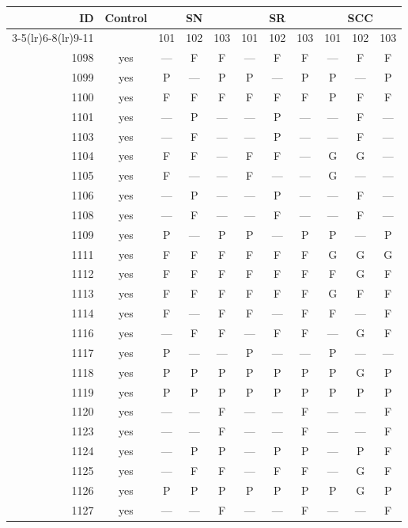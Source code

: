 \begin{table}[p]\centering\small
\begin{tabular*}{\textwidth}{@{\extracolsep{\fill}}rc*{9}{c}@{}}\toprule
ID & Control & \multicolumn{3}{c}{SN} & \multicolumn{3}{c}{SR} & \multicolumn{3}{c}{SCC}\\
\cmidrule(lr){3-5}\cmidrule(lr){6-8}\cmidrule(lr){9-11}
 & & 101 & 102 & 103 & 101 & 102 & 103 & 101 & 102 & 103\\\midrule
1098 & yes & — & F & F & — & F & F & — & F & F\\
1099 & yes & P & — & P & P & — & P & P & — & P\\
1100 & yes & F & F & F & F & F & F & P & F & F\\
1101 & yes & — & P & — & — & P & — & — & F & —\\
1103 & yes & — & F & — & — & P & — & — & F & —\\
1104 & yes & F & F & — & F & F & — & G & G & —\\
1105 & yes & F & — & — & F & — & — & G & — & —\\
1106 & yes & — & P & — & — & P & — & — & F & —\\
1108 & yes & — & F & — & — & F & — & — & F & —\\
1109 & yes & P & — & P & P & — & P & P & — & P\\
1111 & yes & F & F & F & F & F & F & G & G & G\\
1112 & yes & F & F & F & F & F & F & F & G & F\\
1113 & yes & F & F & F & F & F & F & G & F & F\\
1114 & yes & F & — & F & F & — & F & F & — & F\\
1116 & yes & — & F & F & — & F & F & — & G & F\\
1117 & yes & P & — & — & P & — & — & P & — & —\\
1118 & yes & P & P & P & P & P & P & P & G & P\\
1119 & yes & P & P & P & P & P & P & P & P & P\\
1120 & yes & — & — & F & — & — & F & — & — & F\\
1123 & yes & — & — & F & — & — & F & — & — & F\\
1124 & yes & — & P & P & — & P & P & — & P & F\\
1125 & yes & — & F & F & — & F & F & — & G & F\\
1126 & yes & P & P & P & P & P & P & P & G & P\\
1127 & yes & — & — & F & — & — & F & — & — & F\\

\end{tabular*}
\end{table}
